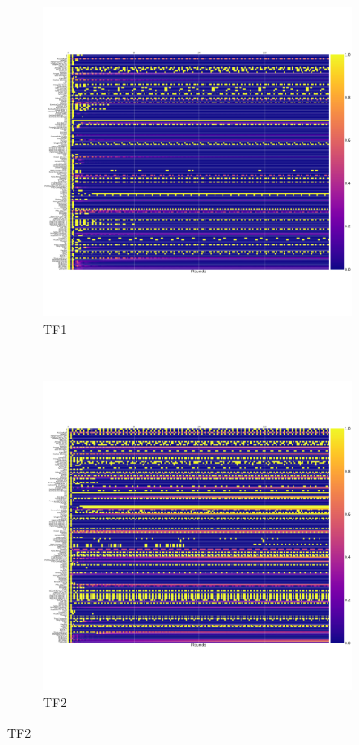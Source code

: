 \documentclass[10pt,journal]{IEEEtran}
\begin{document}
\begin{figure}[!hbtp]
    \centering
    \begin{subfigure}[t]{.5\columnwidth}
        \centering
        \includegraphics[width=\columnwidth]{img/cooperation_0_0_10000_TF1_array.pdf}
        \caption{TF1}
    \end{subfigure}%
    ~
    \begin{subfigure}[t]{.5\columnwidth}
        \centering
        \includegraphics[width=\columnwidth]{img/cooperation_0_0_10000_TF2_array.pdf}
        \caption{TF2}
    \end{subfigure}


\end{figure}
\end{document}
